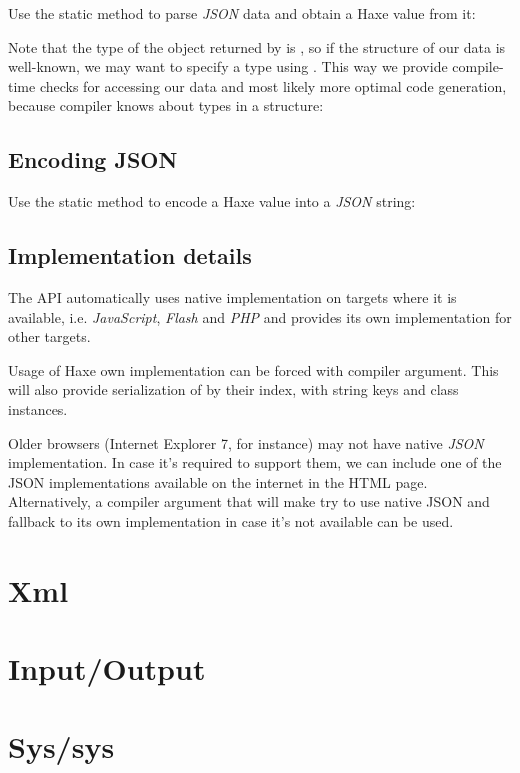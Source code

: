 Use the  static method to parse \emph{JSON} data and obtain a Haxe value from it:

Note that the type of the object returned by  is , so if the structure of our data is well-known, we may want to specify a type using . This way we provide compile-time checks for accessing our data and most likely more optimal code generation, because compiler knows about types in a structure:

\subsection{Encoding JSON}
\label{std-Json-encoding}

Use the  static method to encode a Haxe value into a \emph{JSON} string:

\subsection{Implementation details}
\label{std-Json-implementation-details}

The  API automatically uses native implementation on targets where it is available, i.e. \emph{JavaScript}, \emph{Flash} and \emph{PHP} and provides its own implementation for other targets.

Usage of Haxe own implementation can be forced with  compiler argument. This will also provide serialization of  by their index,  with string keys and class instances.

Older browsers (Internet Explorer 7, for instance) may not have native \emph{JSON} implementation. In case it's required to support them, we can include one of the JSON implementations available on the internet in the HTML page. Alternatively, a  compiler argument that will make  try to use native JSON and fallback to its own implementation in case it's not available can be used.

\section{Xml}
\label{std-Xml}

\section{Input/Output}
\label{std-input-output}

\section{Sys/sys}
\label{std-sys}
